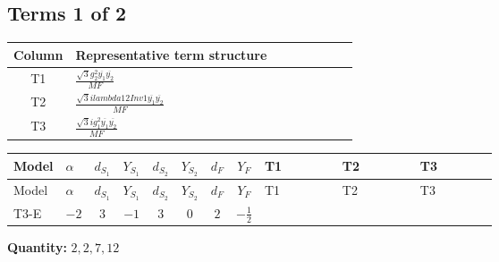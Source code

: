 \documentclass[8pt]{article}
\begin{document}
\begin{landscape}
\subsection*{Terms 1 of 2}
\begin{center}
\begin{tabular}{@{}c >{\raggedright\arraybackslash}p{0.82\linewidth}@{}}
\toprule
Column & Representative term structure \\
\midrule
T1 & \(\displaystyle \frac{\sqrt{3} g_{2}^{2} \overline{y_{1}} \overline{y_{2}}}{MF}\) \\
\midrule
T2 & \(\displaystyle \frac{\sqrt{3} i lambda12Inv1 \overline{y_{1}} \overline{y_{2}}}{MF}\) \\
\midrule
T3 & \(\displaystyle \frac{\sqrt{3} i g_{1}^{2} \overline{y_{1}} \overline{y_{2}}}{MF}\) \\
\midrule
\bottomrule
\end{tabular}
\end{center}
\smallskip
\tiny
\begin{longtable}{@{}llcccccc >{\raggedright\arraybackslash}p{0.21\linewidth} >{\raggedright\arraybackslash}p{0.21\linewidth} >{\raggedright\arraybackslash}p{0.21\linewidth}@{}}
\toprule
Model & $\alpha$ & $d_{S_1}$ & $Y_{S_1}$ & $d_{S_2}$ & $Y_{S_2}$ & $d_F$ & $Y_F$ & T1 & T2 & T3 \\
\midrule
\endfirsthead
\toprule
Model & $\alpha$ & $d_{S_1}$ & $Y_{S_1}$ & $d_{S_2}$ & $Y_{S_2}$ & $d_F$ & $Y_F$ & T1 & T2 & T3 \\
\midrule
\endhead
T3-E & $-2$ & $3$ & $-1$ & $3$ & $0$ & $2$ & $-\frac{1}{2}$ & \scriptsize\adjustbox{max width=\linewidth}{$\begin{gathered} \frac{\sqrt{3} g_{2}^{2} \overline{y_{1}} \overline{y_{2}}}{6 MF}\end{gathered}$} & \scriptsize\adjustbox{max width=\linewidth}{$\begin{gathered} - \frac{\sqrt{3} i lambda12Inv1 \overline{y_{1}} \overline{y_{2}}}{6 MF}\end{gathered}$} & \scriptsize\adjustbox{max width=\linewidth}{$\begin{gathered} \frac{\sqrt{3} i g_{1}^{2} \overline{y_{1}} \overline{y_{2}}}{8 MF}\end{gathered}$} \\
\midrule
\bottomrule
\end{longtable}
\clearpage
\noindent\textbf{Quantity: }$\mathrm{2,2,7,12}$\par\smallskip

\end{landscape}
\end{document}
